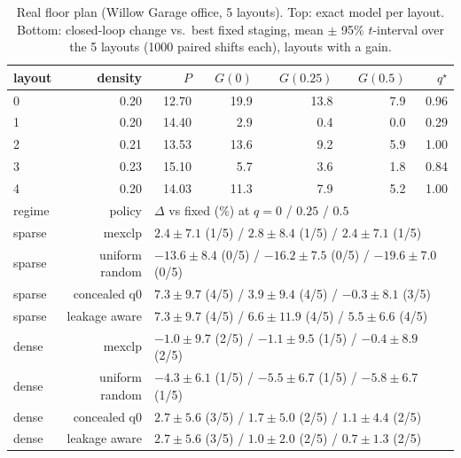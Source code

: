 \begin{table}[h]\centering\caption{Real floor plan (Willow Garage office, 5 layouts). Top: exact model per layout. Bottom: closed-loop change vs.\ best fixed staging, mean $\pm$ 95\% $t$-interval over the 5 layouts (1000 paired shifts each), layouts with a gain.}\label{tab:s-willow}\scriptsize
\begin{tabular}{@{}lrrrrrr@{}}\toprule layout & density & $P$ & $G(0)$ & $G(0.25)$ & $G(0.5)$ & $q^\star$\\\midrule
0 & 0.20 & 12.70 & 19.9 & 13.8 & 7.9 & 0.96\\
1 & 0.20 & 14.40 & 2.9 & 0.4 & 0.0 & 0.29\\
2 & 0.21 & 13.53 & 13.6 & 9.2 & 5.9 & 1.00\\
3 & 0.23 & 15.10 & 5.7 & 3.6 & 1.8 & 0.84\\
4 & 0.20 & 14.03 & 11.3 & 7.9 & 5.2 & 1.00\\
\midrule regime & policy & \multicolumn{5}{l}{$\Delta$ vs fixed (\%) at $q=0$ / $0.25$ / $0.5$}\\\midrule
sparse & mexclp & \multicolumn{5}{l}{$2.4\pm7.1$ (1/5) / $2.8\pm8.4$ (1/5) / $2.4\pm7.1$ (1/5)}\\
sparse & uniform random & \multicolumn{5}{l}{$-13.6\pm8.4$ (0/5) / $-16.2\pm7.5$ (0/5) / $-19.6\pm7.0$ (0/5)}\\
sparse & concealed q0 & \multicolumn{5}{l}{$7.3\pm9.7$ (4/5) / $3.9\pm9.4$ (4/5) / $-0.3\pm8.1$ (3/5)}\\
sparse & leakage aware & \multicolumn{5}{l}{$7.3\pm9.7$ (4/5) / $6.6\pm11.9$ (4/5) / $5.5\pm6.6$ (4/5)}\\
dense & mexclp & \multicolumn{5}{l}{$-1.0\pm9.7$ (2/5) / $-1.1\pm9.5$ (1/5) / $-0.4\pm8.9$ (2/5)}\\
dense & uniform random & \multicolumn{5}{l}{$-4.3\pm6.1$ (1/5) / $-5.5\pm6.7$ (1/5) / $-5.8\pm6.7$ (1/5)}\\
dense & concealed q0 & \multicolumn{5}{l}{$2.7\pm5.6$ (3/5) / $1.7\pm5.0$ (2/5) / $1.1\pm4.4$ (2/5)}\\
dense & leakage aware & \multicolumn{5}{l}{$2.7\pm5.6$ (3/5) / $1.0\pm2.0$ (2/5) / $0.7\pm1.3$ (2/5)}\\
\bottomrule\end{tabular}\end{table}
